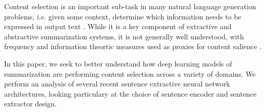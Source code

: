 




Content selection is an important sub-task in many natural language generation
problems, i.e. given some context, determine which information
needs to be expressed in output text \cite{gatt2018survey}. While it is a key component of 
extractive and abstractive summarization systems, it is not generally well 
understood, with frequency and information theortic measures used as proxies
for content salience \cite{hong2014improving}. 


In this paper, we seek to better understand how deep learning models of 
summarization are performing content selection across a variety of domains.
We perform an analysis 
of several recent sentence extractive neural network architectures, 
looking particulary at the choice of sentence encoder and sentence 
extractor design. 

